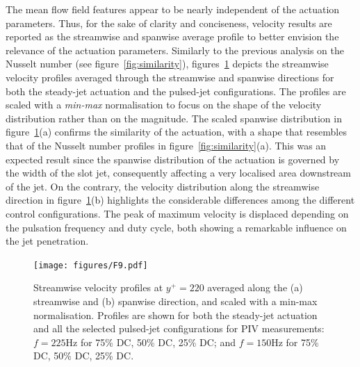 The mean flow field features appear to be nearly independent of the actuation parameters. Thus, for the sake of clarity and conciseness, velocity results are reported as the streamwise and spanwise average profile to better envision the relevance of the actuation parameters. Similarly to the previous analysis on the Nusselt number (see figure~\ref{fig:similarity}), figures~\ref{fig:PIV_profile_a} depicts the streamwise velocity profiles averaged through the streamwise and spanwise directions for both the steady-jet actuation and the pulsed-jet configurations. The profiles are scaled with a \textit{min-max} normalisation to focus on the shape of the velocity distribution rather than on the magnitude. The scaled spanwise distribution in figure~\ref{fig:PIV_profile_a}(a) confirms the similarity of the actuation, with a shape that resembles that of the Nusselt number profiles in figure~\ref{fig:similarity}(a). This was an expected result since the spanwise distribution of the actuation is governed by the width of the slot jet, consequently affecting a very localised area downstream of the jet. On the contrary, the velocity distribution along the streamwise direction in figure~\ref{fig:PIV_profile_a}(b) highlights the considerable differences among the different control configurations. The peak of maximum velocity is displaced depending on the pulsation frequency and duty cycle, both showing a remarkable influence on the jet penetration.

\begin{figure} %
    \centering
    \texttt{[image: figures/F9.pdf]}
    \caption{Streamwise velocity profiles at $y^+ = 220$ averaged along the (a) streamwise and (b) spanwise direction, and scaled with a min-max normalisation. Profiles are shown for both the steady-jet  actuation  and all the selected pulsed-jet configurations for PIV measurements: $f = 225\mathrm{Hz}$ for 75\% DC, 50\% DC, 25\% DC; and $f = 150\mathrm{Hz}$ for 75\% DC, 50\% DC, 25\% DC.}
    \label{fig:PIV_profile_a}
\end{figure}

